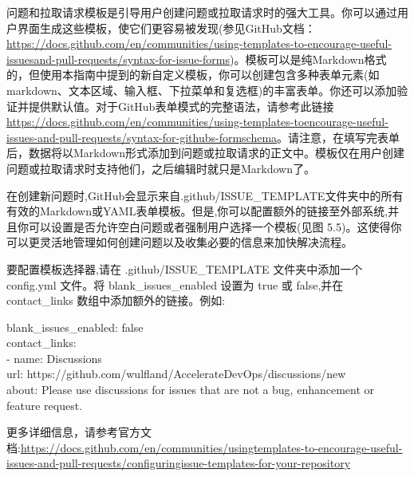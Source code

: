 
问题和拉取请求模板是引导用户创建问题或拉取请求时的强大工具。你可以通过用户界面生成这些模板，使它们更容易被发现(参见GitHub文档：\url{https://docs.github.com/en/communities/using-templates-to-encourage-useful-issuesand-pull-requests/syntax-for-issue-forms})。模板可以是纯Markdown格式的，但使用本指南中提到的新自定义模板，你可以创建包含多种表单元素(如markdown、文本区域、输入框、下拉菜单和复选框)的丰富表单。你还可以添加验证并提供默认值。对于GitHub表单模式的完整语法，请参考此链接 \url{https://docs.github.com/en/communities/using-templates-toencourage-useful-issues-and-pull-requests/syntax-for-githubs-formschema}。请注意，在填写完表单后，数据将以Markdown形式添加到问题或拉取请求的正文中。模板仅在用户创建问题或拉取请求时支持他们，之后编辑时就只是Markdown了。


在创建新问题时,GitHub会显示来自.github/ISSUE\_TEMPLATE文件夹中的所有有效的Markdown或YAML表单模板。但是,你可以配置额外的链接至外部系统,并且你可以设置是否允许空白问题或者强制用户选择一个模板(见图 5.5)。这使得你可以更灵活地管理如何创建问题以及收集必要的信息来加快解决流程。

要配置模板选择器,请在 .github/ISSUE\_TEMPLATE 文件夹中添加一个 config.yml 文件。将 blank\_issues\_enabled 设置为 true 或 false,并在 contact\_links 数组中添加额外的链接。例如:

\begin{tcolorbox}[ breakable,colback = bashcodebg, colframe= black!50!white]
\scriptsize{
blank\_issues\_enabled: false \\
contact\_links: \\
\hspace*{1em}- name:  Discussions \\
\hspace*{2.2em}url: https://github.com/wulfland/AccelerateDevOps/discussions/new \\
\hspace*{2.2em}about: Please use discussions for issues that are not a bug, enhancement or feature request.
}
\end{tcolorbox}

更多详细信息，请参考官方文档:\url{https://docs.github.com/en/communities/usingtemplates-to-encourage-useful-issues-and-pull-requests/configuringissue-templates-for-your-repository}


